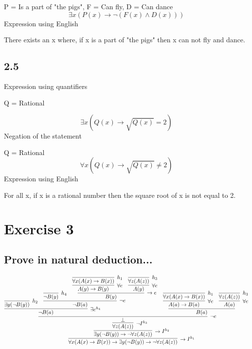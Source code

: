 \documentclass[a4paper,11pt]{article}
\begin{document}
P = Is a part of "the pigs", F = Can fly, D = Can dance
\begin{equation}
    \exists x( P(x) \to \neg (F(x) \land D(x)) )
\end{equation}
Expression using English

There exists an x where,
if x is a part of "the pigs"
then x can not fly and dance.

\subsection*{2.5}
Expression using quantifiers

Q = Rational

\begin{equation}
    \exists x \left( Q(x) \to \sqrt{Q(x)} = 2 \right)
\end{equation}
Negation of the statement

Q = Rational
\begin{equation}
    \forall x \left( Q(x) \to \sqrt{Q(x)} \neq 2 \right)
\end{equation}
Expression using English

For all x,
if x is a rational number
then the square root of x is not equal to 2.

\newpage
\section*{Exercise 3}
\subsection*{Prove in natural deduction...}

$$
\infer[\to I^{h_1}]{\forall x (A(x) \to B(x)) \to \exists y (\neg B(y)) \to \neg \forall z (A(z))}{
    \infer[\to I^{h_2}]{\exists y (\neg B(y)) \to \neg \forall z (A(z))}{
        \infer[\neg I^{h_3}]{\forall z (A(z))}{
            \infer[\neg e]{\bot}{
                \infer[\exists e^{h_4}]{\neg B(a)}{
                    \infer[h_2]{\exists y (\neg B(y))}{}
                    &
                    \infer[\neg e]{\neg B(a)}{
                        \infer[h_4]{\neg B(y)}{}
                        &
                        \infer[\to e]{B(y)}{
                            \infer[\forall e]{A(y) \to B(y)}{
                                \infer[h_1]{\forall x (A(x) \to B(x))}{}
                            }
                            &
                            \infer[\forall e]{A(y)}{
                                \infer[h_3]{\forall z (A(z))}{}
                            }
                        }
                    }
                }
                &
                \infer[]{B(a)}{
                    \infer[\forall e]{A(a) \to B(a)}{
                        \infer[h_1]{\forall x (A(x) \to B(x))}{}
                    }
                    &
                    \infer[\forall e]{A(a)}{
                        \infer[h_3]{\forall z (A(z))}{}
                    }
                }
            }
        }
    }
}
$$
\end{document}
